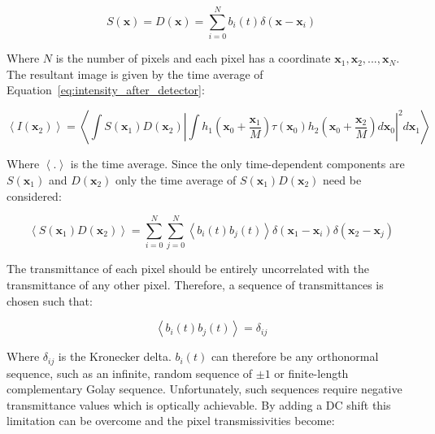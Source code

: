 \begin{equation}\label{eq:detector_aperture_time}
S\left(\textbf{x}\right) = D\left(\textbf{x}\right) = \sum_{i=0}^{N} b_{i}\left(t\right)\delta\left(\textbf{x} - \textbf{x}_{i}\right)
\end{equation}

Where $N$ is the number of pixels and each pixel has a 
coordinate $\textbf{x}_{1}, \textbf{x}_{2},...,\textbf{x}_{N}$. 
The resultant image is given by the time average of 
Equation~\ref{eq:intensity_after_detector}:

\begin{equation}\label{eq:confocal_image_time_ave}
\left\langle I\left(\textbf{x}_{2}\right)\right\rangle = \left\langle \int S\left(\textbf{x}_{1}\right) D\left(\textbf{x}_{2}\right) \left| \int h_{1}\left(\textbf{x}_{0} + \frac{\textbf{x}_{1}}{M}\right) \tau\left(\textbf{x}_{0}\right) h_{2}\left(\textbf{x}_{0} + \frac{\textbf{x}_{2}}{M}\right)d\textbf{x}_{0}\right|^{2}d\textbf{x}_{1}\right\rangle
\end{equation}

Where $\left\langle . \right\rangle$ is the time average. 
Since the only time-dependent components are 
$S\left(\textbf{x}_{1}\right)$ and $D\left(\textbf{x}_{2}\right)$ 
only the time average of 
$S\left(\textbf{x}_{1}\right) D\left(\textbf{x}_{2}\right)$ 
need be considered:

\begin{equation}\label{eq:SD_time_ave}
\left\langle S\left(\textbf{x}_{1}\right) D\left(\textbf{x}_{2}\right)\right\rangle = \sum_{i=0}^{N}\sum_{j=0}^{N} \left\langle b_{i}\left(t\right) b_{j}\left(t\right)\right\rangle \delta\left(\textbf{x}_{1} - \textbf{x}_{i}\right) \delta\left(\textbf{x}_{2} - \textbf{x}_{j}\right)
\end{equation}

The transmittance of each pixel should be entirely 
uncorrelated with the transmittance of any other pixel. 
Therefore, a sequence of transmittances is chosen such that:

\begin{equation}\label{eq:pixel_uncorrelation}
\left\langle b_{i}\left(t\right) b_{j}\left(t\right)\right\rangle = \delta_{ij}
\end{equation}

Where $\delta_{ij}$ is the Kronecker delta. $b_{i}\left(t\right)$ 
can therefore be any orthonormal sequence, such as an infinite, 
random sequence of $\pm1$ or finite-length complementary Golay 
sequence\cite{golay1949multi}. Unfortunately, such sequences 
require negative transmittance values which is optically 
achievable. By adding a DC shift this limitation can be overcome 
and the pixel transmissivities become:

